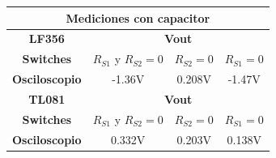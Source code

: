 \begin{table}[H]
\begin{center}
\begin{tabular}{|c|c|c|c|}
\hline
\multicolumn{4}{|c|}{\textbf{Mediciones con capacitor}}                                        \\ \hline
\textbf{LF356}        & \multicolumn{3}{c|}{\textbf{Vout}}                       \\ \hline
\textbf{Switches}     & $R_{S1}$ y $ R_{S2} = 0$ & $ R_{S2} = 0$ & $ R_{S1} = 0$ \\ \hline
\textbf{Osciloscopio} & -1.36V                    & 0.208V      & -1.47V      \\ \hline
\textbf{TL081}        & \multicolumn{3}{c|}{\textbf{Vout}}                       \\ \hline
\textbf{Switches}     & $R_{S1}$ y $ R_{S2} = 0$ & $ R_{S2} = 0$ & $ R_{S1} = 0$ \\ \hline
\textbf{Osciloscopio} & 0.332V                   & 0.203V        & 0.138V        \\ \hline
\end{tabular}
\end{center}
\end{table}

